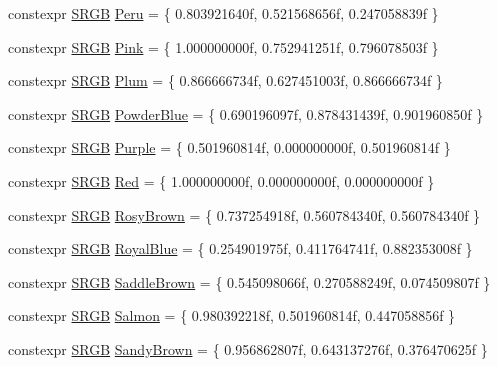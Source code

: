 \begin{DoxyCompactItemize}
\item 
constexpr \hyperlink{structmage_1_1_s_r_g_b}{S\+R\+GB} \hyperlink{namespacemage_1_1color_aca42febccdb4b483536cfbb9a2465a95}{Peru} = \{ 0.\+803921640f, 0.\+521568656f, 0.\+247058839f \}
\item 
constexpr \hyperlink{structmage_1_1_s_r_g_b}{S\+R\+GB} \hyperlink{namespacemage_1_1color_ac109fad1f6bb079c13fa28ad8bbc18e8}{Pink} = \{ 1.\+000000000f, 0.\+752941251f, 0.\+796078503f \}
\item 
constexpr \hyperlink{structmage_1_1_s_r_g_b}{S\+R\+GB} \hyperlink{namespacemage_1_1color_ac5a82445f9ac2d063ded8fed2abf6d63}{Plum} = \{ 0.\+866666734f, 0.\+627451003f, 0.\+866666734f \}
\item 
constexpr \hyperlink{structmage_1_1_s_r_g_b}{S\+R\+GB} \hyperlink{namespacemage_1_1color_a87439299510e5d00a8f52a8e2ec94a3c}{Powder\+Blue} = \{ 0.\+690196097f, 0.\+878431439f, 0.\+901960850f \}
\item 
constexpr \hyperlink{structmage_1_1_s_r_g_b}{S\+R\+GB} \hyperlink{namespacemage_1_1color_abc4e5ab035f468c7235a23b28f49f3d2}{Purple} = \{ 0.\+501960814f, 0.\+000000000f, 0.\+501960814f \}
\item 
constexpr \hyperlink{structmage_1_1_s_r_g_b}{S\+R\+GB} \hyperlink{namespacemage_1_1color_acd7c4f3812280375313aae5e97a7d21d}{Red} = \{ 1.\+000000000f, 0.\+000000000f, 0.\+000000000f \}
\item 
constexpr \hyperlink{structmage_1_1_s_r_g_b}{S\+R\+GB} \hyperlink{namespacemage_1_1color_a65da8e36be323fb9eb38de492925352b}{Rosy\+Brown} = \{ 0.\+737254918f, 0.\+560784340f, 0.\+560784340f \}
\item 
constexpr \hyperlink{structmage_1_1_s_r_g_b}{S\+R\+GB} \hyperlink{namespacemage_1_1color_a01213c51a9d103e84356bb05902863a4}{Royal\+Blue} = \{ 0.\+254901975f, 0.\+411764741f, 0.\+882353008f \}
\item 
constexpr \hyperlink{structmage_1_1_s_r_g_b}{S\+R\+GB} \hyperlink{namespacemage_1_1color_ad240ed02994f05630bf98fdc63965b2d}{Saddle\+Brown} = \{ 0.\+545098066f, 0.\+270588249f, 0.\+074509807f \}
\item 
constexpr \hyperlink{structmage_1_1_s_r_g_b}{S\+R\+GB} \hyperlink{namespacemage_1_1color_aed2febf825b068fe2e584c6df453caf9}{Salmon} = \{ 0.\+980392218f, 0.\+501960814f, 0.\+447058856f \}
\item 
constexpr \hyperlink{structmage_1_1_s_r_g_b}{S\+R\+GB} \hyperlink{namespacemage_1_1color_ad642cf958318eb8780e278a7620252b9}{Sandy\+Brown} = \{ 0.\+956862807f, 0.\+643137276f, 0.\+376470625f \}
\item 

\end{DoxyCompactItemize}
